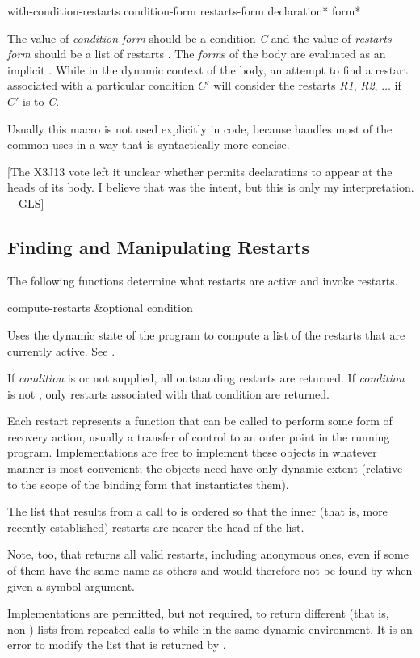 \begin{defmac}
with-condition-restarts condition-form restarts-form
  {declaration}* {form}*

The value of \emph{condition-form} should be a condition \emph{C} and the value
of \emph{restarts-form} should be a list of restarts .  The \emph{form\/}s of the body are evaluated as an implicit .
While in the dynamic context of the body, an attempt to find a restart
associated with a particular condition $C'$ will consider the restarts
\emph{R1}, \emph{R2}, $\ldots$ if $C'$ is  to \emph{C}.

 Usually this macro is not used explicitly in code, because 
handles most of the common uses in a way that is syntactically more concise.

[The X3J13 vote  left it unclear whether 
permits declarations to appear at the heads of its body.
I believe that was the intent, but this is only my interpretation.---GLS]
\end{defmac}

\subsection{Finding and Manipulating Restarts}

The following functions determine what restarts are
active and invoke restarts.

\begin{defun}[Function]
compute-restarts &optional condition

Uses the dynamic state of the program to compute a list of the restarts that are
currently active. See .

If \emph{condition} is  or not supplied, all outstanding restarts
are returned.
If \emph{condition} is not , only restarts associated
with that condition are returned.

Each restart represents a function that can be called to perform some form of
recovery action, usually a transfer of control to an outer point in the running
program. Implementations are free to implement these objects in whatever manner
is most convenient; the objects need have only dynamic extent (relative to the
scope of the binding form that instantiates them).

The list that results from a call to  is ordered so that
the inner (that is, more recently established) restarts are nearer the head of
the list.

Note, too, that  returns all valid restarts, including
anonymous ones, even if some of them have the same name as others and would
therefore not be found by  when given a symbol argument.

Implementations are permitted, but not required, to return different (that is,
non-) lists from repeated calls to  while in the
same dynamic environment. It is an error to modify the list that is returned by
.
\end{defun}



